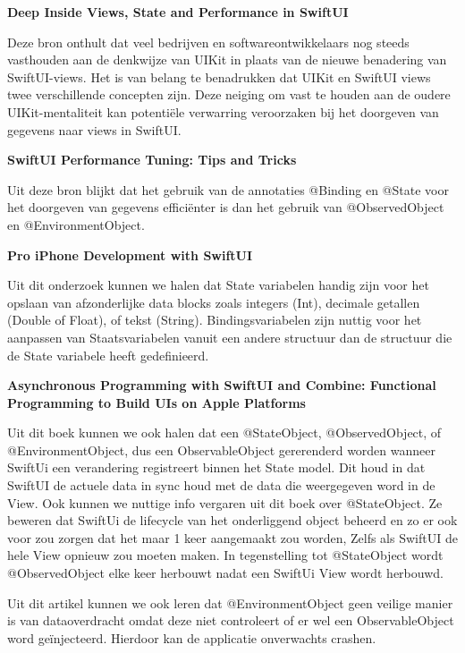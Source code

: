 \textbf{Deep Inside Views, State and Performance in SwiftUI~\autocite{Long2020}}

Deze bron onthult dat veel bedrijven en softwareontwikkelaars nog steeds vasthouden aan de denkwijze van UIKit in plaats van de nieuwe benadering van SwiftUI-views. Het is van belang te benadrukken dat UIKit en SwiftUI views twee verschillende concepten zijn. Deze neiging om vast te houden aan de oudere UIKit-mentaliteit kan potentiële verwarring veroorzaken bij het doorgeven van gegevens naar views in SwiftUI.

\textbf{SwiftUI Performance Tuning: Tips and Tricks\newline ~\autocite{Amisha2022}}

Uit deze bron blijkt dat het gebruik van de annotaties @Binding en @State voor het doorgeven van gegevens efficiënter is dan het gebruik van @ObservedObject en @EnvironmentObject.


\textbf{Pro iPhone Development with SwiftUI~\autocite{WangWallace2022PIDw}}

Uit dit onderzoek kunnen we halen dat State variabelen handig zijn voor het opslaan van afzonderlijke data blocks zoals integers (Int), decimale getallen (Double of Float), of tekst (String). Bindingsvariabelen zijn nuttig voor het aanpassen van Staatsvariabelen vanuit een andere structuur dan de structuur die de State variabele heeft gedefinieerd.

\textbf{Asynchronous Programming with SwiftUI and Combine: Functional Programming to Build UIs on Apple Platforms~\autocite{friese2023state}}

Uit dit boek kunnen we ook halen dat een @StateObject, @ObservedObject, of @EnvironmentObject, dus een ObservableObject gererenderd worden wanneer SwiftUi een verandering registreert binnen het State model. Dit houd in dat SwiftUI de actuele data in sync houd met de data die weergegeven word in de View. Ook kunnen we nuttige info vergaren uit dit boek over @StateObject. Ze beweren dat SwiftUi de lifecycle van het onderliggend object beheerd en zo er ook voor zou zorgen dat het maar 1 keer aangemaakt zou worden, Zelfs als SwiftUI de hele View opnieuw zou moeten maken. In tegenstelling tot @StateObject wordt @ObservedObject elke keer herbouwt nadat een SwiftUi View wordt herbouwd.

Uit dit artikel kunnen we ook leren dat @EnvironmentObject geen veilige manier is van dataoverdracht omdat deze niet controleert of er wel een ObservableObject word geïnjecteerd. Hierdoor kan de applicatie onverwachts crashen.



